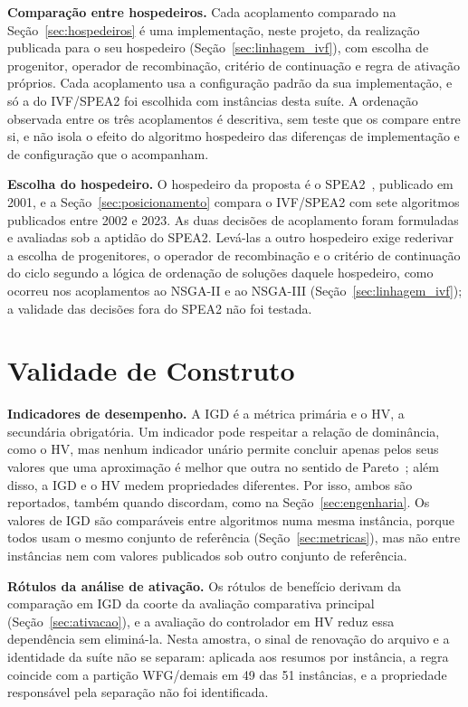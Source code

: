 \textbf{Comparação entre hospedeiros.} Cada acoplamento comparado na Seção~\ref{sec:hospedeiros} é uma implementação, neste projeto, da realização publicada para o seu hospedeiro (Seção~\ref{sec:linhagem_ivf}), com escolha de progenitor, operador de recombinação, critério de continuação e regra de ativação próprios. Cada acoplamento usa a configuração padrão da sua implementação, e só a do IVF/SPEA2 foi escolhida com instâncias desta suíte. A ordenação observada entre os três acoplamentos é descritiva, sem teste que os compare entre si, e não isola o efeito do algoritmo hospedeiro das diferenças de implementação e de configuração que o acompanham.

\textbf{Escolha do hospedeiro.} O hospedeiro da proposta é o SPEA2~\cite{zitzler2001spea2}, publicado em 2001, e a Seção~\ref{sec:posicionamento} compara o IVF/SPEA2 com sete algoritmos publicados entre 2002 e 2023. As duas decisões de acoplamento foram formuladas e avaliadas sob a aptidão do SPEA2. Levá-las a outro hospedeiro exige rederivar a escolha de progenitores, o operador de recombinação e o critério de continuação do ciclo segundo a lógica de ordenação de soluções daquele hospedeiro, como ocorreu nos acoplamentos ao NSGA-II e ao NSGA-III (Seção~\ref{sec:linhagem_ivf}); a validade das decisões fora do SPEA2 não foi testada.

\section{Validade de Construto}

\textbf{Indicadores de desempenho.} A IGD é a métrica primária e o HV, a secundária obrigatória. Um indicador pode respeitar a relação de dominância, como o HV, mas nenhum indicador unário permite concluir apenas pelos seus valores que uma aproximação é melhor que outra no sentido de Pareto~\cite{zitzler2004performance}; além disso, a IGD e o HV medem propriedades diferentes. Por isso, ambos são reportados, também quando discordam, como na Seção~\ref{sec:engenharia}. Os valores de IGD são comparáveis entre algoritmos numa mesma instância, porque todos usam o mesmo conjunto de referência (Seção~\ref{sec:metricas}), mas não entre instâncias nem com valores publicados sob outro conjunto de referência.

\textbf{Rótulos da análise de ativação.} Os rótulos de benefício derivam da comparação em IGD da coorte da avaliação comparativa principal (Seção~\ref{sec:ativacao}), e a avaliação do controlador em HV reduz essa dependência sem eliminá-la. Nesta amostra, o sinal de renovação do arquivo e a identidade da suíte não se separam: aplicada aos resumos por instância, a regra coincide com a partição WFG/demais em 49 das 51 instâncias, e a propriedade responsável pela separação não foi identificada.

